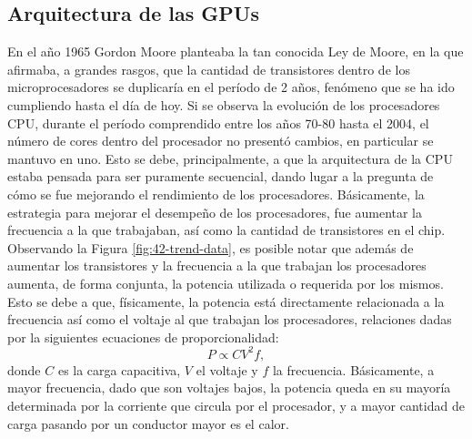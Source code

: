 \subsection{Arquitectura de las GPUs}\label{sec:gpu-arch}







En el año 1965 Gordon Moore planteaba la tan conocida Ley de Moore, en la que afirmaba, a grandes rasgos, que la cantidad de transistores dentro de los microprocesadores se duplicaría en el período de 2 años, fenómeno que se ha ido cumpliendo hasta el día de hoy.
Si se observa la evolución de los procesadores CPU, durante el período comprendido entre los años 70-80 hasta el 2004, el número de cores dentro del procesador no presentó cambios, en particular se mantuvo en uno. Esto se debe, principalmente, a que la arquitectura de la CPU estaba pensada para ser puramente secuencial, dando lugar a la pregunta de cómo se fue mejorando el rendimiento de los procesadores. Básicamente, la estrategia para mejorar el desempeño de los procesadores, fue aumentar la frecuencia a la que trabajaban, así como la cantidad de transistores en el chip. 
Observando la Figura \ref{fig:42-trend-data}, es posible notar que además de aumentar los transistores y la frecuencia a la que trabajan los procesadores aumenta, de forma conjunta, la potencia utilizada o requerida por los mismos. Esto se debe a que, físicamente, la potencia está directamente  relacionada a la frecuencia así como el voltaje al que trabajan los procesadores, relaciones dadas por la siguientes ecuaciones de proporcionalidad:
\begin{equation*}
P \propto CV^2f,
\end{equation*}
donde $C$ es la carga capacitiva, $V$ el voltaje y $f$ la frecuencia. Básicamente, a mayor frecuencia, dado que son voltajes bajos, la potencia queda en su mayoría determinada por la corriente que circula por el procesador, y a mayor cantidad de carga pasando por un conductor mayor es el calor.

